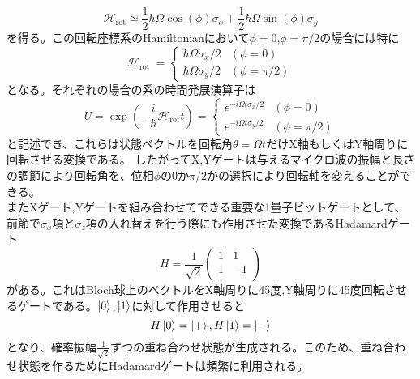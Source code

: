         \begin{equation}
            \mathcal{H}_{\text{rot}} \simeq \frac{1}{2} \hbar \Omega \cos (\phi) \sigma_{x}+\frac{1}{2} \hbar \Omega \sin (\phi) \sigma_{y}
        \end{equation}
        を得る。この回転座標系のHamiltonianにおいて$\phi=0$,$\phi=\pi/2$の場合には特に
        \begin{equation}
            \mathcal{H}_{\text {rot }}=\left\{\begin{array}{ll}
            \hbar \Omega \sigma_{x} / 2 & (\phi=0) \\
            \hbar \Omega \sigma_{y} / 2 & (\phi=\pi / 2)
            \end{array}\right.
        \end{equation}
        となる。それぞれの場合の系の時間発展演算子は
        \begin{equation}
            U = \exp \left(-\frac{i}{\hbar} \mathcal{H}_{\mathrm{rot}} t\right)=\left\{\begin{array}{ll}
            e^{-i \Omega t \sigma_{x} / 2} & (\phi=0) \\
            e^{-i \Omega t \sigma_{y} / 2} & (\phi=\pi / 2)
            \end{array}\right.
        \end{equation}
        と記述でき、これらは状態ベクトルを回転角$\theta=\Omega t$だけX軸もしくはY軸周りに回転させる変換である。
        したがってX,Yゲートは与えるマイクロ波の振幅と長さの調節により回転角を、位相$\phi$の0か$\pi/2$かの選択により回転軸を変えることができる。\\
        またXゲート,Yゲートを組み合わせてできる重要な1量子ビットゲートとして、前節で$\sigma_x$項と$\sigma_z$項の入れ替えを行う際にも作用させた変換であるHadamardゲート
        \begin{equation}
            H=\frac{1}{\sqrt2}\left(
            \begin{array}{cc}
                1 & 1 \\
                1 & -1 \\
            \end{array}
            \right)
        \end{equation}
        がある。これはBloch球上のベクトルをX軸周りに45度,Y軸周りに45度回転させるゲートである。$\ket{0},\ket{1}$に対して作用させると
        \begin{equation}
            H \ket{0} = \ket{+}, H \ket{1} = \ket{-}
        \end{equation}
        となり、確率振幅$\frac{1}{\sqrt2}$ずつの重ね合わせ状態が生成される。このため、重ね合わせ状態を作るためにHadamardゲートは頻繁に利用される。

